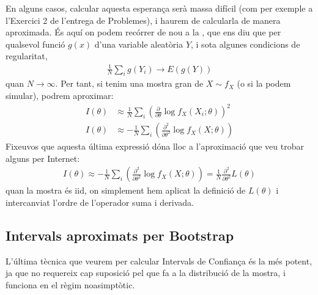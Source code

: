 \documentclass[letterpaper,10pt,english]{sphinxmanual}
\begin{document}
En alguns casos, calcular aquesta esperança serà massa difícil (com
per exemple a l’Exercici 2 de l’entrega de Problemes), i haurem
de calcular\sphinxhyphen{}la de manera aproximada. És aquí on podem recórrer de nou a la ,
que ens diu que per qualsevol funció \(g(x)\) d’una variable aleatòria
\(Y\), i sota algunes condicions de regularitat,
\begin{equation*}
\begin{split}\frac{1}{N}\sum_i g(Y_i) \to E(g(Y))\end{split}
\end{equation*}
quan \(N \to \infty\). Per tant, si tenim una mostra gran
de \(X \sim f_X\) (o si la podem simular), podrem aproximar:
\begin{equation*}
\begin{split}I(\theta) &\approx \frac{1}{N}\sum_i \left(\frac{\partial}{\partial \theta} \log f_X(X_i;\theta)\right)^2 \\
I(\theta) &\approx - \frac{1}{N}\sum_i \left( \frac{\partial^2}{\partial \theta^2} \log f_X(X;\theta)\right)\end{split}
\end{equation*}
Fixeu\sphinxhyphen{}vos que aquesta última expressió dóna lloc a l’aproximació
que veu trobar alguns per Internet:
\begin{equation*}
\begin{split}I(\theta) \approx - \frac{1}{N}\sum_i \left( \frac{\partial^2}{\partial \theta^2} \log f_X(X;\theta)\right) = \frac{1}{N}\frac{\partial^2}{\partial \theta^2} L(\theta)\end{split}
\end{equation*}
quan la mostra és iid, on simplement hem aplicat la definició de \(L(\theta)\) i
intercanviat l’ordre de l’operador suma i derivada.


\subsection{Intervals aproximats per Bootstrap}
\label{\detokenize{0_Intro/0_3_Estimacio:intervals-aproximats-per-bootstrap}}
L’última tècnica que veurem per calcular Intervals de Confiança
és la més potent, ja que no requereix cap suposició
pel que fa a la distribució de la mostra, i funciona en el règim no\sphinxhyphen{}asimptòtic.
\end{document}
